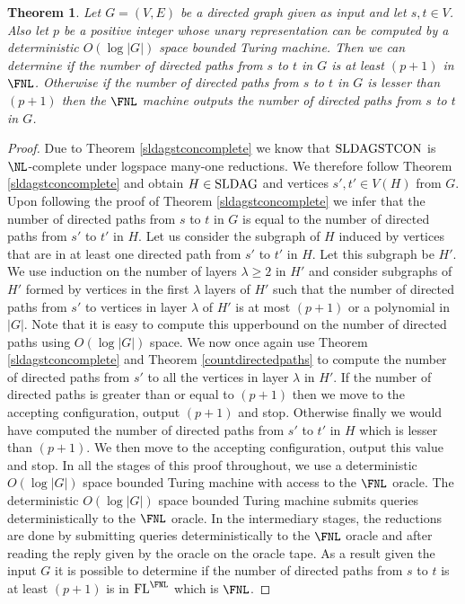 \documentclass{amsbook}
\newtheorem{theorem}{Theorem}[chapter]
\theoremstyle{definition}
\theoremstyle{remark}
\numberwithin{section}{chapter}
\numberwithin{equation}{chapter}
\newcommand{\FL}{\mbox{\rm FL}}
\newcommand{\LDAG}{\mbox{\rm SLDAG}}
\newcommand{\LDAGSTCON}{\mbox{\rm SLDAGSTCON}}
\begin{document}
\begin{theorem}\label{polynomialacceptingtheorem}
Let $G=(V,E)$ be a directed graph given as input and let $s,t\in V$. Also let $p$ be a positive integer whose unary representation can be computed by a deterministic $O(\log |G|)$ space bounded Turing machine. Then we can determine if the number of directed paths from $s$ to $t$ in $G$ is at least $(p+1)$ in $\FNL$. Otherwise if the number of directed paths from $s$ to $t$ in $G$ is lesser than $(p+1)$ then the $\FNL$ machine outputs the number of directed paths from $s$ to $t$ in $G$.
\end{theorem}
\begin{proof}
Due to Theorem \ref{sldagstconcomplete} we know that $\LDAGSTCON$ is $\NL$-complete under logspace many-one reductions. We therefore follow Theorem \ref{sldagstconcomplete} and obtain $H\in\LDAG$ and vertices $s',t'\in V(H)$ from $G$. Upon following the proof of Theorem \ref{sldagstconcomplete} we infer that the number of directed paths from $s$ to $t$ in $G$ is equal to the number of directed paths from $s'$ to $t'$ in $H$. Let us consider the subgraph of $H$ induced by vertices that are in at least one directed path from $s'$ to $t'$ in $H$. Let this subgraph be $H'$. We use induction on the number of layers $\lambda\geq 2$ in $H'$ and consider subgraphs of $H'$ formed by vertices in the first $\lambda$ layers of $H'$ such that the number of directed paths from $s'$ to vertices in layer $\lambda$ of $H'$ is at most $(p+1)$ or a polynomial in $|G|$. Note that it is easy to compute this upperbound on the number of directed paths using $O(\log |G|)$ space. We now once again use Theorem \ref{sldagstconcomplete} and Theorem \ref{countdirectedpaths} to compute the number of directed paths from $s'$ to all the vertices in layer $\lambda$ in $H'$. If the number of directed paths is greater than or equal to $(p+1)$ then we move to the accepting configuration, output $(p+1)$ and stop. Otherwise finally we would have computed the number of directed paths from $s'$ to $t'$ in $H$ which is lesser than $(p+1)$. We then move to the accepting configuration, output this value and stop. In all the stages of this proof throughout, we use a deterministic $O(\log |G|)$ space bounded Turing machine with access to the $\FNL$ oracle. The deterministic $O(\log |G|)$ space bounded Turing machine submits queries deterministically to the $\FNL$ oracle. In the intermediary stages, the reductions are done by submitting queries deterministically to the $\FNL$ oracle and after reading the reply given by the oracle on the oracle tape. As a result given the input $G$ it is possible to determine if the number of directed paths from $s$ to $t$ is at least $(p+1)$ is in $\FL^{\FNL}$ which is $\FNL$.
\end{proof}
\end{document}
